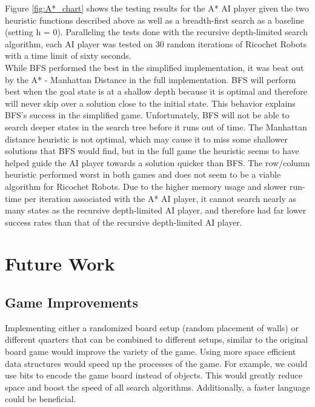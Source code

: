 \documentclass[a4paper,10pt]{article}
\begin{document}
  Figure \ref{fig:A*_chart} shows the testing results for the A* AI player given the two heuristic functions described above as well as a breadth-first search as a baseline (setting h = 0).  Paralleling the tests done with the recursive depth-limited search algorithm, each AI player was tested on 30 random iterations of Ricochet Robots with a time limit of sixty seconds. \\
  While BFS performed the best in the simplified implementation, it was beat out by the A* - Manhattan Distance in the full implementation.  BFS will perform best when the goal state is at a shallow depth because it is optimal and therefore will never skip over a solution close to the initial state.  This behavior explains BFS's success in the simplified game.  Unfortunately, BFS will not be able to search deeper states in the search tree before it runs out of time.  The Manhattan distance heuristic is not optimal, which may cause it to miss some shallower solutions that BFS would find, but in the full game the heuristic seems to have helped guide the AI player towards a solution quicker than BFS.  The row/column heuristic performed worst in both games and does not seem to be a viable algorithm for Ricochet Robots. Due to the higher memory usage and slower run-time per iteration associated with the A* AI player, it cannot search nearly as many states as the recursive depth-limited AI player, and therefore had far lower success rates than that of the recursive depth-limited AI player.

\section{Future Work}
\label{sec:futureWork}

  \subsection{Game Improvements}
  Implementing either a randomized board setup (random placement of walls) or different quarters that can be combined to different setups, similar to the original board game would improve the variety of the game. Using more space efficient data structures would speed up the processes of the game. For example, we could use bits to encode the game board instead of objects. This would greatly reduce space and boost the speed of all search algorithms. Additionally, a faster language could be beneficial.
\end{document}
